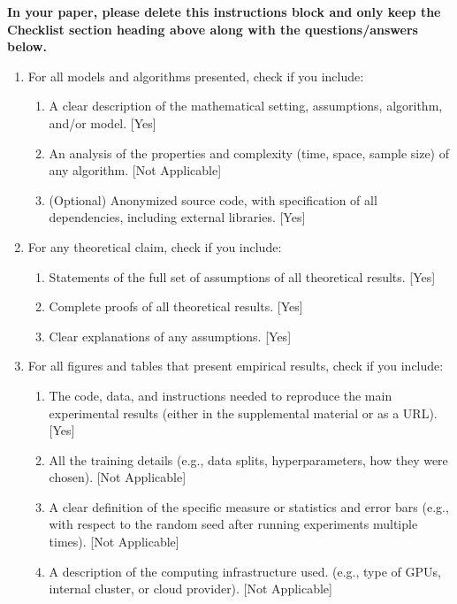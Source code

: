 \documentclass[twoside]{article}
\theoremstyle{definition}
\begin{document}
\textbf{In your paper, please delete this instructions block and only keep the Checklist section heading above along with the questions/answers below.}


 \begin{enumerate}


 \item For all models and algorithms presented, check if you include:
 \begin{enumerate}
   \item A clear description of the mathematical setting, assumptions, algorithm, and/or model. [Yes]
   \item An analysis of the properties and complexity (time, space, sample size) of any algorithm. [Not Applicable]
   \item (Optional) Anonymized source code, with specification of all dependencies, including external libraries. [Yes]
 \end{enumerate}


 \item For any theoretical claim, check if you include:
 \begin{enumerate}
   \item Statements of the full set of assumptions of all theoretical results. [Yes]
   \item Complete proofs of all theoretical results. [Yes]
   \item Clear explanations of any assumptions. [Yes]     
 \end{enumerate}


 \item For all figures and tables that present empirical results, check if you include:
 \begin{enumerate}
   \item The code, data, and instructions needed to reproduce the main experimental results (either in the supplemental material or as a URL). [Yes]
   \item All the training details (e.g., data splits, hyperparameters, how they were chosen). [Not Applicable]
         \item A clear definition of the specific measure or statistics and error bars (e.g., with respect to the random seed after running experiments multiple times). [Not Applicable]
         \item A description of the computing infrastructure used. (e.g., type of GPUs, internal cluster, or cloud provider). [Not Applicable]
 \end{enumerate}


\end{enumerate}
\end{document}
